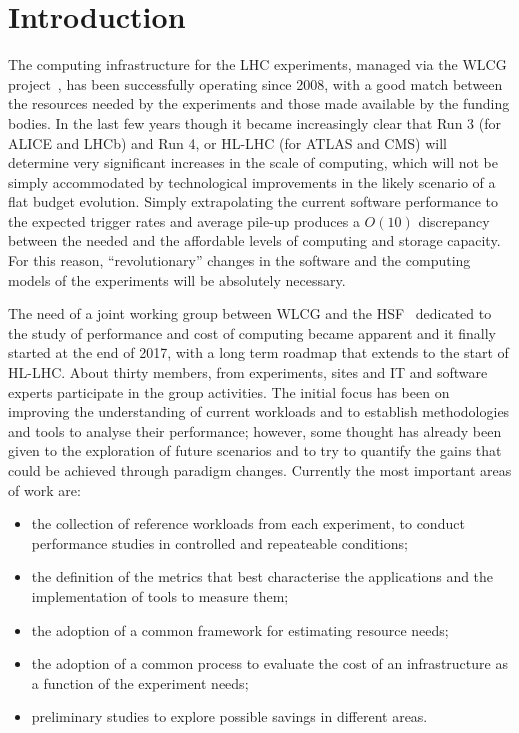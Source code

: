 \section{Introduction}
The computing infrastructure for the LHC experiments, managed via the
WLCG project~\cite{wlcg}, has been successfully operating since 2008,
with a good match between the resources needed by the experiments and
those made available by the funding bodies. In the last few years
though it became increasingly clear that Run 3 (for ALICE and LHCb)
and Run 4, or HL-LHC (for ATLAS and CMS) will determine very
significant increases in the scale of computing, which will not be
simply accommodated by technological improvements in the likely
scenario of a flat budget evolution. Simply extrapolating the current
software performance to the expected trigger rates and average pile-up
produces a $O(10)$ discrepancy between the needed and the affordable
levels of computing and storage capacity. For this reason,
``revolutionary'' changes in the software and the computing models of
the experiments will be absolutely necessary.

The need of a joint working group between WLCG and the
HSF~\cite{hsf} dedicated to the study of performance and cost of
computing became apparent and it finally started at the end of
2017, with a long term roadmap that extends to the start of
HL-LHC. About thirty members, from experiments, sites and IT and software
experts participate in the group activities. The initial focus has
been on improving the understanding of current workloads and to
establish methodologies and tools to analyse their performance; however,
some thought has already been given to the exploration of future
scenarios and to try to quantify the gains that could be achieved
through paradigm changes. Currently the most important areas of work are:
\begin{itemize}
\item the collection of reference workloads from each experiment, to conduct
  performance studies in controlled and repeateable conditions;
\item the definition of the metrics that best characterise the applications and the implementation of tools to measure them;
\item the adoption of a common framework for estimating resource needs;
\item the adoption of a common process to evaluate the cost of an infrastructure
  as a function of the experiment needs;
\item preliminary studies to explore possible savings in different areas.
\end{itemize}

